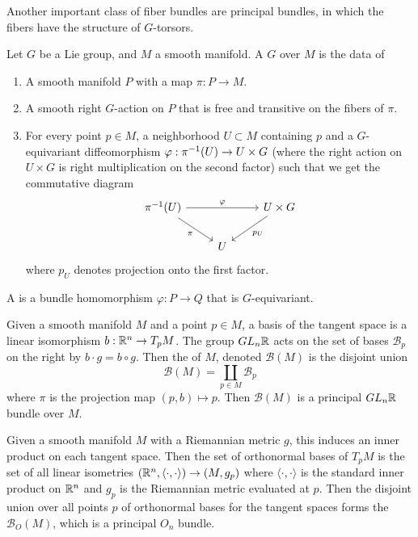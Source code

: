 %
Another important class of fiber bundles are principal bundles, in which
the fibers have the structure of $G$-torsors.
%
\begin{defn}
Let $G$ be a Lie group, and $M$ a smooth manifold. A  $G$
over $M$ is the data of
%
\begin{enumerate}
  \item A smooth manifold $P$ with a map $\pi : P \to M$.
  \item A smooth right $G$-action on $P$ that is free and transitive on the
  fibers of $\pi$.
  \item For every point $p \in M$, a neighborhood $U \subset M$ containing $p$ and
  a $G$-equivariant diffeomorphism $\varphi: \pi^{-1}(U) \to U \times G$ (where
  the right action on $U \times G$ is right multiplication on the second factor)
  such that we get the commutative diagram
  \[\begin{tikzcd}
  \pi\inv(U) \ar[dr, "\pi"']\ar[rr, "\varphi"]&& U \times G \ar[dl, "p_U"]\\
  & U
  \end{tikzcd}\]
  where $p_U$ denotes projection onto the first factor.
\end{enumerate}
A  is a bundle homomorphism $\varphi : P \to Q$
that is $G$-equivariant.
\end{defn}
%
\begin{exmp}
Given a smooth manifold $M$ and a point $p \in M$, a basis of the
tangent space is a linear isomorphism $b : \mathbb{R}^n \to T_pM$. The group
$GL_n\mathbb{R}$ acts on the set of bases $\mathcal{B}_p$  on the right by
$b \cdot g = b \circ g$. Then the  of $M$, denoted
$\mathcal{B}(M)$ is the disjoint union
\[
\mathcal{B}(M) = \coprod_{p \in M}\mathcal{B}_p
\]
where $\pi$ is the projection map $(p,b) \mapsto p$. Then $\mathcal{B}(M)$
is a principal $GL_n\mathbb{R}$ bundle over $M$.
\end{exmp}
%
\begin{exmp}
Given a smooth manifold $M$ with a Riemannian metric $g$, this induces an inner
product on each tangent space. Then the set of orthonormal bases of $T_pM$ is the
set of all linear isometries $(\mathbb{R}^n, \langle\cdot,\cdot\rangle) \to (M, g_p)$
where $\langle\cdot,\cdot\rangle$ is the standard inner product on $\mathbb{R}^n$ and
$g_p$ is the Riemannian metric evaluated at $p$. Then the disjoint union over
all points $p$ of orthonormal bases for the tangent spaces forms the
 $\mathcal{B}_O(M)$, which is a principal $O_n$
bundle.
\end{exmp}
